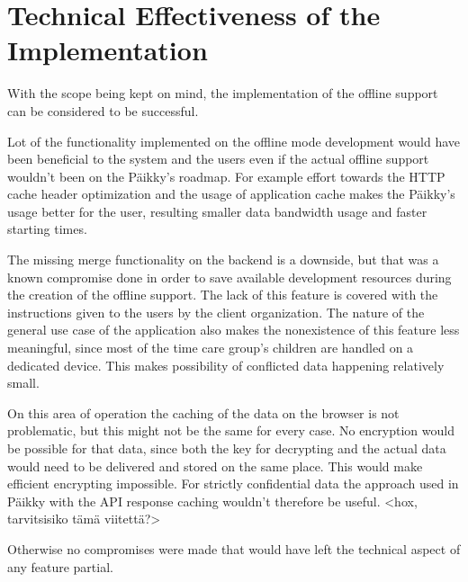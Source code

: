 \section{Technical Effectiveness of the Implementation}





With the scope being kept on mind, the implementation of the offline support can be considered to be successful. 

Lot of the functionality implemented on the offline mode development would have been beneficial to the system and the users even if the actual offline support wouldn't been on the Päikky's roadmap. For example effort towards the HTTP cache header optimization and the usage of application cache makes the Päikky's usage better for the user, resulting smaller data bandwidth usage and faster starting times.

The missing merge functionality on the backend is a downside, but that was a known compromise done in order to save available development resources during the creation of the offline support. The lack of this feature is covered with the instructions given to the users by the client organization. The nature of the general use case of the application also makes the nonexistence of this feature less meaningful, since most of the time care group's children are handled on a dedicated device. This makes possibility of conflicted data happening relatively small.

On this area of operation the caching of the data on the browser is not problematic, but this might not be the same for every case. No encryption would be possible for that data, since both the key for decrypting and the actual data would need to be delivered and stored on the same place. This would make efficient encrypting impossible. For strictly confidential data the approach used in Päikky with the API response caching wouldn't therefore be useful.  <hox, tarvitsisiko tämä viitettä?>

Otherwise no compromises were made that would have left the technical aspect of any feature partial.  



 

